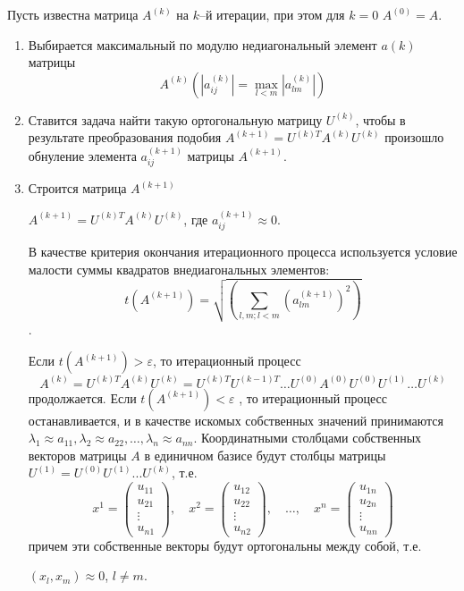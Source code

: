 Пусть известна матрица $A^{(k)}$ на $k$–й итерации, при этом для $k=0$ $A^{(0)} = A$.
\begin{enumerate}
    \item Выбирается максимальный по модулю недиагональный элемент $a(k)$ 
    матрицы
    $$A^{(k)}\left(|a^{(k)}_{ij}| = \max_{l<m} |a^{(k)}_{lm}|\right)$$
    \item Ставится задача найти такую ортогональную матрицу $U^{(k)}$,
        чтобы в результате преобразования подобия 
        $A^{(k+1)} =U^{(k)T} A^{(k)}U^{(k)}$ произошло
        обнуление элемента $a^{(k+1)}_{ij}$ матрицы $A^{(k+1)}$.
    \item Строится матрица $A^{(k+1)}$
    
        $A^{(k+1)}=U^{(k)T}A^{(k)}U^{(k)}$,
    где $a^{(k+1)}_{ij} \approx 0$.

    В качестве критерия окончания итерационного процесса используется
    условие малости суммы квадратов внедиагональных элементов:
    $$t\left(A^{(k+1)}\right)= \sqrt{\left(\sum_{l,m;l<m} \left(a^{(k+1)}_{lm} \right)^{2}\right)}$$.
    
    \pagebreak
    Если $t\left(A^{(k+1)}\right) > \varepsilon$, то итерационный процесс
    $$A^{(k)} =U^{(k)T} A^{(k)} U^{(k)} =U^{(k)T} U^{(k-1)T} \dots U^{(0)} A^{(0)} U^{(0)} U^{(1)} \dots U^{(k)}$$
    продолжается. Если $t\left(A^{(k+1)}\right) < \varepsilon$ , то итерационный процесс останавливается, и в качестве
    искомых собственных значений принимаются 
    $\lambda_1 \approx a_{11} , \lambda_2 \approx a_{22} ,
        \dots,\lambda_n \approx a_{nn}$.
    Координатными столбцами собственных векторов матрицы $A$ в 
    единичном базисе будут столбцы матрицы 
    $U^{(1)} = U^{(0)} U^{(1)} ...U^{(k)}$, т.е.
    $$x^1 = \begin{pmatrix}
        u_{11} \\
        u_{21} \\
        \vdots \\
        u_{n1}
    \end{pmatrix},\quad
    x^2 = \begin{pmatrix}
        u_{12} \\
        u_{22} \\
        \vdots \\
        u_{n2}
    \end{pmatrix},\quad
    \dots,\quad
    x^n = \begin{pmatrix}
        u_{1n} \\
        u_{2n} \\
        \vdots \\
        u_{nn}
    \end{pmatrix}$$
    причем эти собственные векторы будут ортогональны между собой, т.е.
    
    $(x_l,x_m) \approx 0$, $l \neq m$.
\end{enumerate}

\pagebreak